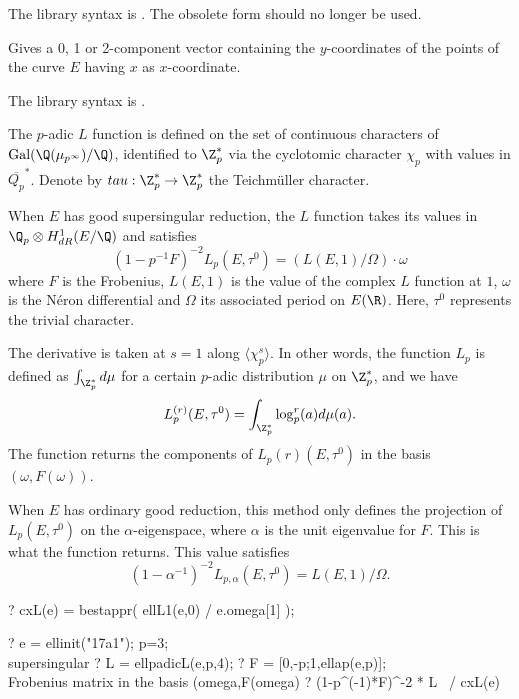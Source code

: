 The library syntax is .
The obsolete form  should no longer be
used.

\label{se:ellordinate}
Gives a 0, 1 or 2-component vector containing
the $y$-coordinates of the points of the curve $E$ having $x$ as
$x$-coordinate.

The library syntax is .

\label{se:ellpadicL}
The $p$-adic $L$ function is defined on the set of continuous characters
 of $\text{Gal}(\Q(\mu_{p^{\infty}})/ \Q)$, identified to $\Z_p^*$
 via the cyclotomic character $\chi_p$ with values in $\overline{Q_p}^*$.
 Denote by $tau:\Z_p^*\to\Z_p^*$ the Teichm\"uller character.

 When $E$ has good supersingular reduction, the $L$ function takes its
 values in $\Q_p \otimes H^1_{dR}(E/\Q)$ and satisfies
 $$(1-p^{-1} F)^{-2} L_p(E, \tau^0)= (L(E,1) / \Omega) \cdot \omega$$
 where $F$ is the Frobenius, $L(E,1)$ is the value of the complex $L$
 function at $1$, $\omega$ is the N\'eron differential
 and $\Omega$ its associated period on $E(\R)$. Here, $\tau^0$ represents
 the trivial character.

 The derivative is taken at $s=1$ along $\langle\chi_p^s\rangle$.
 In other words, the function $L_p$ is defined as
 $\int_{\Z_p^*} d \mu$ for a certain $p$-adic distribution $\mu$ on
 $\Z_p^*$, and we have
  $$L_p^{(r)}(E, \tau^0) = \int_{\Z_p^*} \log_p^r(a) d\mu(a).$$
 The function returns the components of $L_p{(r)}(E,\tau^0)$ in
 the basis $(\omega, F(\omega))$.
 \smallskip

 When $E$ has ordinary good reduction, this method only defines
 the projection of $L_p(E,\tau^0)$ on the $\alpha$-eigenspace,
 where $\alpha$ is the unit eigenvalue for $F$. This is what the function
 returns. This value satisfies
 $$(1- \alpha^{-1})^{-2} L_{p,\alpha}(E,\tau^0)= L(E,1) / \Omega.$$

 \bprog
 ? cxL(e) = bestappr( ellL1(e,0) / e.omega[1] );

 ? e = ellinit("17a1"); p=3; \\ supersingular
 ? L = ellpadicL(e,p,4);
 ? F = [0,-p;1,ellap(e,p)]; \\ Frobenius matrix in the basis (omega,F(omega)
 ? (1-p^(-1)*F)^-2 * L~ / cxL(e)

